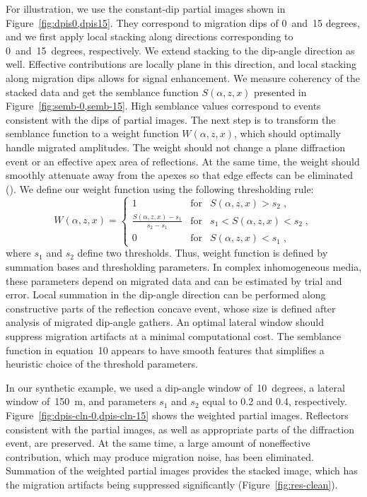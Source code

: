 For illustration, we use the constant-dip partial images shown in Figure~\ref{fig:dpis0,dpis15}. They correspond to migration dips of 0~and~15 degrees, 
and we first apply local stacking along directions corresponding to 0~and~15~degrees, respectively. We extend stacking to the dip-angle direction
as well. Effective contributions are locally plane in this direction, and local stacking along migration dips allows for signal enhancement.
We measure coherency of the stacked data and get the semblance function $S(\alpha, z, x)$ presented in Figure~\ref{fig:semb-0,semb-15}. 
High semblance values correspond to events consistent with the dips of partial images. The next step is to transform the semblance function
to a weight function $W(\alpha, z, x)$, which should optimally handle migrated amplitudes. The weight should not change a plane diffraction
event or an effective apex area of reflections. At the same time, the weight should smoothly attenuate away from the apexes so that 
edge effects can be eliminated (\citealp[]{hertweck03}). We define our weight function using the following thresholding rule:
\begin{equation}
W(\alpha, z, x) = 
\left\{ \begin{array}{rcl}
1 & \mbox{for} & S(\alpha, z, x) > s_2\;, \\ 
\frac {S(\alpha, z, x) - s_1}{s_2 - s_1} & \mbox{for} & s_1 < S(\alpha, z, x) < s_2\;, \\
0 & \mbox{for} & S(\alpha, z, x) < s_1\;,
\end{array}\right.
\end {equation}
where $s_1$ and $s_2$ define two thresholds. Thus, weight function is
defined by summation bases and thresholding parameters. In complex
inhomogeneous media, these parameters depend on migrated data
and can be estimated by trial and error. Local summation in the
dip-angle direction can be performed along constructive parts of the
reflection concave event, whose size is defined after analysis of
migrated dip-angle gathers.  An optimal lateral window should suppress
migration artifacts at a minimal computational cost. The semblance
function in equation~10 appears to have smooth features that
simplifies a heuristic choice of the threshold parameters.


In our synthetic example, we used a dip-angle window of~10~degrees, a lateral window of~150~m, and parameters $s_1$ and $s_2$ equal to 0.2 and 0.4, respectively. Figure~\ref{fig:dpis-cln-0,dpis-cln-15} shows the weighted
partial images. Reflectors consistent with the partial images, as well as appropriate parts of the diffraction event, are preserved. 
At the same time, a large amount of noneffective contribution, which may produce migration noise, has been eliminated. 
Summation of the weighted partial images provides the stacked image, which has the migration artifacts being suppressed significantly
(Figure~\ref{fig:res-clean}).

